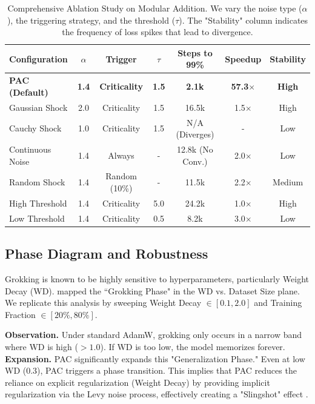 \documentclass{article}
\theoremstyle{plain}
\theoremstyle{definition}
\theoremstyle{remark}
\begin{document}
\begin{table}[t]
\caption{Comprehensive Ablation Study on Modular Addition. We vary the noise type ($\alpha$), the triggering strategy, and the threshold ($\tau$). The "Stability" column indicates the frequency of loss spikes that lead to divergence.}
\label{tab:ablation}
\begin{center}
\begin{small}
\begin{sc}
\begin{tabular}{lcccccc}
\toprule
Configuration & $\alpha$ & Trigger & $\tau$ & Steps to 99\% & Speedup & Stability \\
\midrule
\textbf{PAC (Default)} & \textbf{1.4} & \textbf{Criticality} & \textbf{1.5} & \textbf{2.1k} & \textbf{57.3$\times$} & \textbf{High} \\
\midrule
Gaussian Shock & 2.0 & Criticality & 1.5 & 16.5k & 1.5$\times$ & High \\
Cauchy Shock & 1.0 & Criticality & 1.5 & N/A (Diverges) & - & Low \\
\midrule
Continuous Noise & 1.4 & Always & - & 12.8k (No Conv.) & 2.0$\times$ & Low \\
Random Shock & 1.4 & Random (10\%) & - & 11.5k & 2.2$\times$ & Medium \\
\midrule
High Threshold & 1.4 & Criticality & 5.0 & 24.2k & 1.0$\times$ & High \\
Low Threshold & 1.4 & Criticality & 0.5 & 8.2k & 3.0$\times$ & Low \\
\bottomrule
\end{tabular}
\end{sc}
\end{small}
\end{center}
\end{table}

\subsection{Phase Diagram and Robustness}
\label{subsec:phase_diagram}
Grokking is known to be highly sensitive to hyperparameters, particularly Weight Decay (WD). \citet{zimerman2023phase} mapped the ``Grokking Phase" in the WD vs. Dataset Size plane.
We replicate this analysis by sweeping Weight Decay $\in [0.1, 2.0]$ and Training Fraction $\in [20\%, 80\%]$.

\textbf{Observation.} Under standard AdamW, grokking only occurs in a narrow band where WD is high ($>1.0$). If WD is too low, the model memorizes forever.
\textbf{Expansion.} PAC significantly expands this "Generalization Phase." Even at low WD ($0.3$), PAC triggers a phase transition. This implies that PAC reduces the reliance on explicit regularization (Weight Decay) by providing implicit regularization via the Levy noise process, effectively creating a "Slingshot" effect \cite{thilak2022slingshot}.
\end{document}
